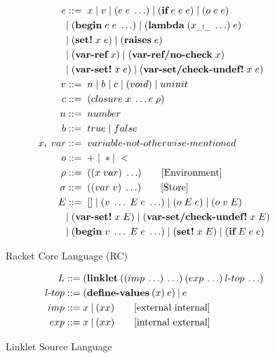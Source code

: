 \documentclass[sigplan,screen,anonymous]{acmart}
\def\dash {\text{-}}
\begin{document}
\begin{figure}[tbp]
  \begin{align*}
    e &::=\; x\; |\; v\; |\; (e\; e\; \ldots)\; |\; (\textbf{if}\; e\; e\; e)\; |\; (o\; e\; e)\; \\
    \; &|\; (\textbf{begin}\; e\; e\; \ldots)\; |\; (\textbf{lambda}\; (x_{\_!\_}\; \ldots)\; e)\\
    \; &|\; (\textbf{set!}\; x\; e)\; |\; (\textbf{raises}\; e)\\
    \; &|\; (\textbf{var\dash ref}\; x)\; |\; (\textbf{var\dash ref/no\dash check}\; x) \\
    \; &|\; (\textbf{var\dash set!}\; x\; e)\; |\; (\textbf{var\dash set/check\dash undef!}\; x\; e) \\
    v   &::=\; n\; |\; b\; |\; c\; |\; (void)\; |\; uninit \\ %
    c   &::=\; (closure\; x\; \ldots e\; \rho) \\
    n   &::=\; number \\
    b   &::=\; true\; |\; false \\
    x,\; var &::=\; variable\dash not\dash otherwise\dash mentioned \\ %
    o  &::=\; +\; |\; * |\; < \\
    \rho   &::=\; ((x\; var)\; \ldots) \tag*{[Environment]}\\
    \sigma   &::=\; ((var\; v)\; \ldots) \tag*{[Store]}\\
    E   &::=\; []\; |\; (v\; \ldots\; E\; e\; \ldots)\; |\; (o\; E\; e)\; |\; (o\; v\; E) \\
    \;  &|\; (\textbf{var\dash set!}\; x\; E)\; |\; (\textbf{var\dash set/check\dash undef!}\; x\; E) \\
    \;  &|\; (\textbf{begin}\; v\; \ldots\; E\; e\; \ldots)\; |\; (\textbf{set!}\; x\; E)\; |\; (\textbf{if}\; E\; e\; e)
  \end{align*}
  \caption{Racket Core Language (RC)}
  \label{fig:racket-source}
\end{figure}

\begin{figure}[tbp]
  \begin{align*}
    L  &::= (\textbf{linklet}\:((imp\: \ldots)\: \ldots)\:(exp\: \ldots)\:l\dash top\:\ldots)\\
    l\dash top &::= (\textbf{define\dash values}\:(x)\:e)\:|\:e \\
    imp &::= x\:|\:(x x) \tag*{[external internal]}\\
    exp &::= x\:|\:(x x) \tag*{[internal external]}
  \end{align*}
  \caption{Linklet Source Language}
  \label{fig:linklet-source}
\end{figure}
\end{document}
